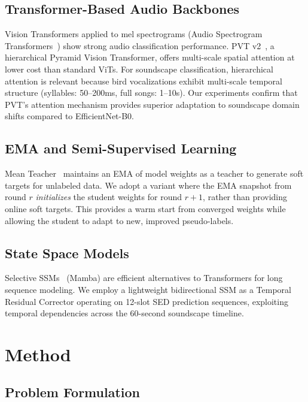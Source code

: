 \documentclass[journal]{IEEEtran}
\begin{document}
\subsection{Transformer-Based Audio Backbones}

Vision Transformers applied to mel spectrograms (Audio Spectrogram Transformers~\cite{gong2021ast}) show strong audio classification performance.
PVT v2~\cite{wang2022pvt}, a hierarchical Pyramid Vision Transformer, offers multi-scale spatial attention at lower cost than standard ViTs.
For soundscape classification, hierarchical attention is relevant because bird vocalizations exhibit multi-scale temporal structure (syllables: 50--200ms, full songs: 1--10s).
Our experiments confirm that PVT's attention mechanism provides superior adaptation to soundscape domain shifts compared to EfficientNet-B0.

\subsection{EMA and Semi-Supervised Learning}

Mean Teacher~\cite{tarvainen2017mean} maintains an EMA of model weights as a teacher to generate soft targets for unlabeled data.
We adopt a variant where the EMA snapshot from round $r$ \emph{initializes} the student weights for round $r+1$, rather than providing online soft targets.
This provides a warm start from converged weights while allowing the student to adapt to new, improved pseudo-labels.

\subsection{State Space Models}

Selective SSMs~\cite{gu2023mamba} (Mamba) are efficient alternatives to Transformers for long sequence modeling.
We employ a lightweight bidirectional SSM as a Temporal Residual Corrector operating on 12-slot SED prediction sequences, exploiting temporal dependencies across the 60-second soundscape timeline.

\section{Method}

\subsection{Problem Formulation}
\end{document}
